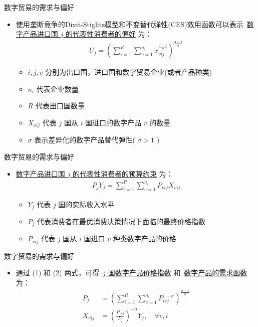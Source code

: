 \documentclass{beamer}
\begin{document}
\begin{frame}{数字贸易的需求与偏好}
    \begin{itemize}
        \item 使用垄断竞争的Dixit-Stiglitz模型和不变替代弹性(CES)效用函数可以表示\ \underline{数字产品进口国 $j$ 的代表性消费者的偏好} 为：
        \begin{gather*}
            U_j = (\sum_{i=1}^{R} \sum_{v=1}^{n_i} x_{vij}^{\frac{\sigma - 1} {\sigma}})^{\frac{\sigma -1}{\sigma}} \tag{1}
        \end{gather*}
        \begin{itemize}
            \item $i, j, v$ 分别为出口国，进口国和数字贸易企业(或者产品种类)
            \item $n_i$ 代表企业数量
            \item $R$ 代表出口国数量
            \item $X_{vij}$ 代表 $j$ 国从 $i$ 国进口的数字产品 $v$ 的数量
            \item $\sigma$ 表示差异化的数字产品替代弹性( $\sigma > 1$ )
        \end{itemize}
    \end{itemize}
\end{frame}

\begin{frame}{数字贸易的需求与偏好}
    \begin{itemize}
        \item \underline{数字产品进口国 $j$ 的代表性消费者的预算约束} 为：
        \begin{gather*}
            P_jY_j = \sum_{i=1}^{R} \sum_{v=1}^{n_i} P_{vij}X_{vij} \tag{2}
        \end{gather*}
        \begin{itemize}
            \item $Y_j$ 代表 $j$ 国的实际收入水平
            \item $P_j$ 代表消费者在最优消费决策情况下面临的最终价格指数
            \item $P_{vij}$ 代表 $j$ 国从 $i$ 国进口 $v$ 种类数字产品的价格
        \end{itemize}
    \end{itemize}
\end{frame}

\begin{frame}{数字贸易的需求与偏好}
    \begin{itemize}
        \item 通过 (1) 和 (2) 两式，可得\ \underline{$j$ 国数字产品价格指数} 和\ \underline{数字产品的需求函数} 为：
        \begin{align*}
            P_j &= (\sum_{i=1}^{R} \sum_{v=1}^{n_i} P_{vij}^{1 - \sigma})^{\frac{\sigma - 1}{\sigma}} \tag{3} \\
            X_{vij} &= (\frac{P_{vij}}{P_j})^{-\sigma}Y_j,\quad \forall v, i \tag{4}
        \end{align*}
    \end{itemize}
\end{frame}
\end{document}
